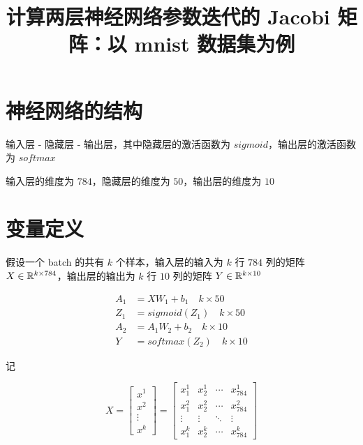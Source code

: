 \documentclass[12pt,a4paper]{amsart}
\title{计算两层神经网络参数迭代的 Jacobi 矩阵：以 mnist 数据集为例}
\begin{document}
\maketitle

\section{神经网络的结构}

输入层 - 隐藏层 - 输出层，其中隐藏层的激活函数为 $sigmoid$，输出层的激活函数为 $softmax$

输入层的维度为 $784$，隐藏层的维度为 $50$，输出层的维度为 $10$

\section{变量定义}

假设一个 batch 的共有 $k$ 个样本，输入层的输入为 $k$ 行 $784$ 列的矩阵 $X \in \mathbb{R}^{k \times 784}$，输出层的输出为 $k$ 行 $10$ 列的矩阵 $Y \in \mathbb{R}^{k \times 10}$

\begin{equation}\label{eq:1}
	\begin{aligned}
		A_1 & = X W_1 + b_1 \hspace{1em} k \times 50   \\
		Z_1 & = sigmoid(Z_1) \hspace{1em} k \times 50  \\
		A_2 & = A_1 W_2 + b_2 \hspace{1em} k \times 10 \\
		Y   & = softmax(Z_2) \hspace{1em} k \times 10
	\end{aligned}
\end{equation}

记

\begin{equation}
	X = \begin{bmatrix}
		x^1    \\
		x^2    \\
		\vdots \\
		x^k
	\end{bmatrix} = \begin{bmatrix}
		x_1^1  & x_2^1  & \cdots & x_{784}^1 \\
		x_1^2  & x_2^2  & \cdots & x_{784}^2 \\
		\vdots & \vdots & \ddots & \vdots    \\
		x_1^k  & x_2^k  & \cdots & x_{784}^k
	\end{bmatrix}
\end{equation}
\end{document}
